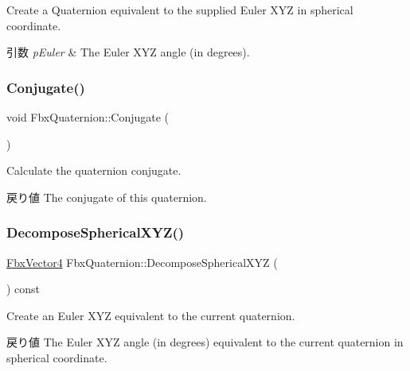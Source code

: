 Create a Quaternion equivalent to the supplied Euler X\+YZ in spherical coordinate. 
\begin{DoxyParams}{引数}
{\em p\+Euler} & The Euler X\+YZ angle (in degrees). \\
\hline
\end{DoxyParams}
\mbox{\label{class_fbx_quaternion_ab829d078c4d1f24449411f686e64e6f7}} 
\subsubsection{\texorpdfstring{Conjugate()}{Conjugate()}}
{\footnotesize\ttfamily void Fbx\+Quaternion\+::\+Conjugate (\begin{DoxyParamCaption}{ }\end{DoxyParamCaption})}

Calculate the quaternion conjugate. \begin{DoxyReturn}{戻り値}
The conjugate of this quaternion. 
\end{DoxyReturn}
\mbox{\label{class_fbx_quaternion_a0b58da2306338f4cf167ecfdd745bbb0}} 
\subsubsection{\texorpdfstring{Decompose\+Spherical\+X\+Y\+Z()}{DecomposeSphericalXYZ()}}
{\footnotesize\ttfamily \hyperlink{class_fbx_vector4}{Fbx\+Vector4} Fbx\+Quaternion\+::\+Decompose\+Spherical\+X\+YZ (\begin{DoxyParamCaption}{ }\end{DoxyParamCaption}) const}

Create an Euler X\+YZ equivalent to the current quaternion. \begin{DoxyReturn}{戻り値}
The Euler X\+YZ angle (in degrees) equivalent to the current quaternion in spherical coordinate. 
\end{DoxyReturn}
\mbox{\label{class_fbx_quaternion_ad3340e0a9950b818f251ab8ae63e0f9e}} 
